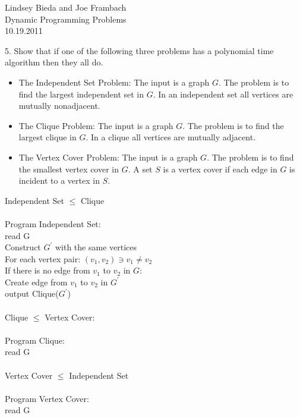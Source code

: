 \documentclass[10pt]{article}
\newcommand{\tab}{\hspace*{2em}}
\newcommand{\tabb}{\hspace*{4em}}
\newcommand{\tabbb}{\hspace*{6em}}
\begin{document}
	\begin{flushright}
	Lindsey Bieda and Joe Frambach\\
	Dynamic Programming Problems\\
	10.19.2011
	\end{flushright}
	5. Show that if one of the following three problems has a polynomial time algorithm then they all do.
	\begin{itemize}
		\item 	The Independent Set Problem: The input is a graph $G$. The problem is to find the largest
				independent set in $G$. In an independent set all vertices are mutually nonadjacent.
		\item 	The Clique Problem: The input is a graph $G$. The problem is to find the largest clique in $G$. In
				a clique all vertices are mutually adjacent.
		\item	The Vertex Cover Problem: The input is a graph $G$. The problem is to find the smallest vertex
				cover in $G$. A set $S$ is a vertex cover if each edge in $G$ is incident to a vertex in $S$.
	\end{itemize}
	Independent Set $\leq$ Clique\\
	\\
	Program Independent Set:\\
	\tab read G\\
	\tab Construct $G^\prime$ with the same vertices\\
	\tab For each vertex pair: $(v_1, v_2) \ni v_1 \neq v_2$\\
	\tabb If there is no edge from $v_1$ to $v_2$ in $G$:\\
	\tabbb Create edge from $v_1$ to $v_2$ in $G^\prime$\\
	\tab output Clique($G^\prime$)\\
	\\
	Clique $\leq$ Vertex Cover:\\
	\\
	Program Clique:\\
	\tab read G\\
	
	\\
	Vertex Cover $\leq$ Independent Set\\
	\\
	Program Vertex Cover:\\
	\tab read G\\
		
\end{document}
